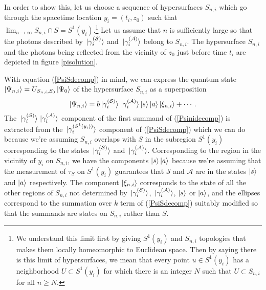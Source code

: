In order to show this, let us choose a sequence of hypersurfaces $S_{n,i}$ which go through the spacetime location $y_i=(t_i, z_0)$ such that $\lim_{n\rightarrow\infty} S_{n,i}\cap S=S^1(y_i).$\footnote{We understand this limit first by giving $S^1(y_i)$ and $S_{n,i}$  topologies that makes them locally homeomorphic to Euclidean space. Then by saying there is this limit of hypersurfaces, we mean that every point $u\in S^1(y_i)$ has a neighborhood $U\subset S^1(y_i)$ for which there is an integer $N$ such that $U\subset S_{n,i}$ for all $n\geq N$.} Let us assume that $n$ is sufficiently large so that the photons described by $\ket*{\gamma_i^{(\mathcal{S})}}$ and $\ket*{\gamma_i^{(\mathcal{A})}}$ belong to $S_{n,i}$. The hypersurface $S_{n,i}$ and the photons being reflected from the vicinity of $z_0$ just before time $t_i$ are  depicted in figure \ref{pisolution}.

With equation (\ref{PsiSdecomp}) in mind, we can express the quantum state $\ket{\Psi_{n,i}}=U_{S_{n,i},S_0}\ket{\Psi_0}$  of the hypersurface $S_{n,i}$ as a superposition 
\begin{equation}\label{Psinidecomp}
\ket{\Psi_{n,i}}=b\ket*{\gamma_i^{(\mathcal{S})}}\ket*{\gamma_i^{(\mathcal{A})}}\ket{s}\ket{a}\ket{\xi_{n,i}}+\cdots.
\end{equation} 
The $\ket*{\gamma_i^{(\mathcal{S})}}\ket*{\gamma_i^{(\mathcal{A})}}$ component of the first summand of (\ref{Psinidecomp}) is extracted from the $\ket*{\gamma_i^{(S^1(y_i))}}$ component of (\ref{PsiSdecomp}) which we can do because we're assuming $S_{n,i}$ overlaps with $S$ in the subregion $S^1(y_i)$ corresponding to the states $\ket*{\gamma_i^{(\mathcal{S})}}$ and $\ket*{\gamma_i^{(\mathcal{A})}}$. Corresponding to the region in the vicinity of $y_i$ on $S_{n,i}$, we have the components $\ket{s}\ket{a}$ because we're assuming that the measurement of $\tau_S$ on $S^1(y_i)$ guarantees that $\mathcal{S}$ and $\mathcal{A}$ are in the states $\ket{s}$ and $\ket{a}$ respectively. The component $\ket{\xi_{n,i}}$ corresponds to the state of all the other regions of $S_{n,i}$ not determined by $\ket*{\gamma_i^{(\mathcal{S})}}$, $\ket*{\gamma_i^{(\mathcal{A})}}$, $\ket{s}$ or $\ket{a}$, and the ellipses correspond to the summation over $k$ term of (\ref{PsiSdecomp}) suitably modified so that the summands are states on $S_{n,i}$ rather than $S$.

